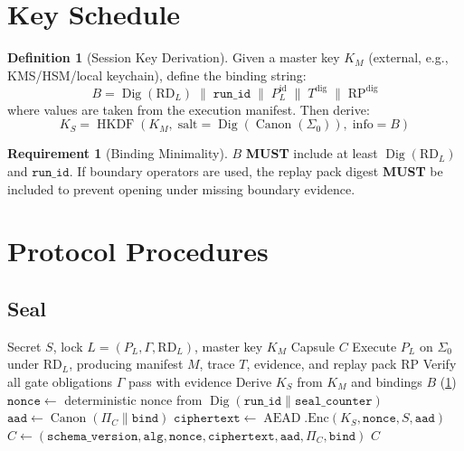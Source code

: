 \documentclass[11pt,a4paper,twoside]{article}
\theoremstyle{definition}
\newtheorem{definition}{Definition}[section]
\newtheorem{requirement}{Requirement}[section]
\theoremstyle{plain}
\theoremstyle{remark}
\DeclareMathOperator{\Canon}{Canon}
\DeclareMathOperator{\Dig}{Dig}
\DeclareMathOperator{\HKDF}{HKDF}
\DeclareMathOperator{\AEAD}{AEAD}
\begin{document}
\section{Key Schedule}\label{sec:cap:keys}

\begin{definition}[Session Key Derivation]\label{def:keysched}
Given a master key $K_M$ (external, e.g., KMS/HSM/local keychain), define
the binding string:
\[
  B = \Dig(\mathrm{RD}_L) \;\|\; \mathtt{run\_id} \;\|\;
      P_L^{\mathrm{id}} \;\|\; T^{\mathrm{dig}} \;\|\;
      \mathrm{RP}^{\mathrm{dig}}
\]
where values are taken from the execution manifest. Then derive:
\[
  K_S = \HKDF(K_M, \; \mathrm{salt} = \Dig(\Canon(\Sigma_0)), \;
        \mathrm{info} = B)
\]
\end{definition}

\begin{requirement}[Binding Minimality]\label{req:bindmin}
$B$ \textbf{MUST} include at least $\Dig(\mathrm{RD}_L)$ and
$\mathtt{run\_id}$. If boundary operators are used, the replay pack
digest \textbf{MUST} be included to prevent opening under missing
boundary evidence.
\end{requirement}

\section{Protocol Procedures}\label{sec:cap:procedures}

\subsection{Seal}

\begin{algorithm}[H]
\caption{\textsc{Seal}: Encrypt secret under evidence-bound policy}
\label{alg:seal}
\begin{algorithmic}[1]
\REQUIRE Secret $S$, lock $L = (P_L, \Gamma, \mathrm{RD}_L)$, master key $K_M$
\ENSURE Capsule $C$
\STATE Execute $P_L$ on $\Sigma_0$ under $\mathrm{RD}_L$, producing
  manifest $M$, trace $T$, evidence, and replay pack $\mathrm{RP}$
\STATE Verify all gate obligations $\Gamma$ pass with evidence
\STATE Derive $K_S$ from $K_M$ and bindings $B$ (\cref{def:keysched})
\STATE $\mathtt{nonce} \gets$ deterministic nonce from
  $\Dig(\mathtt{run\_id} \| \mathtt{seal\_counter})$
\STATE $\mathtt{aad} \gets \Canon(\Pi_C \| \mathtt{bind})$
\STATE $\mathtt{ciphertext} \gets \AEAD.\mathrm{Enc}(K_S, \mathtt{nonce}, S, \mathtt{aad})$
\STATE $C \gets (\mathtt{schema\_version}, \mathtt{alg}, \mathtt{nonce},
  \mathtt{ciphertext}, \mathtt{aad}, \Pi_C, \mathtt{bind})$
\RETURN $C$
\end{algorithmic}
\end{algorithm}
\end{document}
